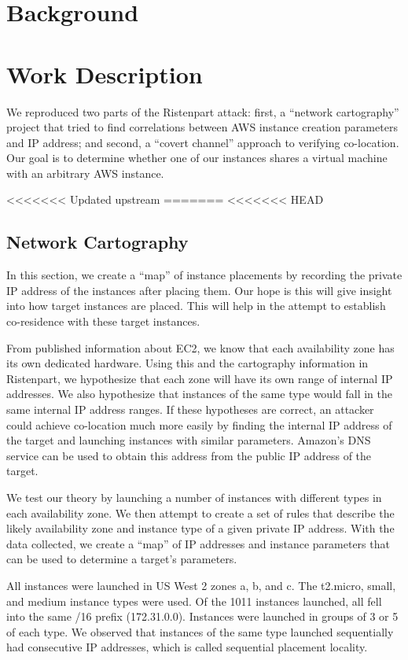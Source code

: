 \documentclass[conference]{IEEEtran}
\begin{document}
\section{Background}\label{sec:background}



\section{Work Description}
We reproduced two parts of the Ristenpart attack: first, a ``network cartography'' project that tried to find
  correlations between AWS instance creation parameters and IP address; and second, a ``covert channel'' approach to
  verifying co-location.
Our goal is to determine whether one of our instances shares a virtual machine with an arbitrary AWS instance.

<<<<<<< Updated upstream
=======
<<<<<<< HEAD
\subsection{Network Cartography}
In this section, we create a “map” of instance placements by recording the private IP address of the instances after placing them.
Our hope is this will give insight into how target instances are placed.
This will help in the attempt to establish co-residence with these target instances.

From published information about EC2, we know that each availability zone has its own dedicated hardware. 
Using this and the cartography information in Ristenpart, we hypothesize that each zone will have its own 
range of internal IP addresses. 
We also hypothesize that instances of the same type would fall in the same internal IP address ranges. 
If these hypotheses are correct, an attacker could achieve co-location much more easily by finding the internal 
IP address of the target and launching instances with similar parameters. 
Amazon’s DNS service can be used to obtain this address from the public IP address of the target.

We test our theory by launching a number of instances with different types in each availability zone. 
We then attempt to create a set of rules that describe the likely availability zone and instance type of a given 
private IP address.  
With the data collected, we create a “map” of IP addresses and instance parameters that can be used to determine 
a target’s parameters.

All instances were launched in US West 2 zones a, b, and c. The t2.micro, small, and medium instance types 
were used. 
Of the 1011 instances launched, all fell into the same /16 prefix (172.31.0.0). 
Instances were launched 
in groups of 3 or 5 of each type. 
We observed that instances of the same type launched sequentially had consecutive IP addresses, which is called 
sequential placement locality. 
\end{document}

